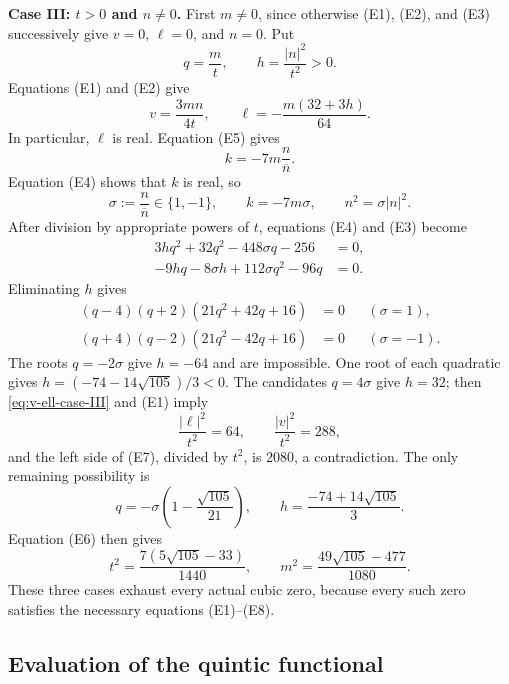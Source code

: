 \documentclass[11pt,reqno]{amsart}
\theoremstyle{definition}
\theoremstyle{remark}
\newcommand{\abs}[1]{\left\lvert #1\right\rvert}
\begin{document}
\medskip
\noindent\textbf{Case III: $t>0$ and $n\ne0$.}
First $m\ne0$, since otherwise (E1), (E2), and (E3) successively give
$v=0$, $\ell=0$, and $n=0$.  Put
\begin{equation}\label{eq:q-h}
q=\frac mt,
\qquad
h=\frac{\abs n^2}{t^2}>0.
\end{equation}
Equations (E1) and (E2) give
\begin{equation}\label{eq:v-ell-case-III}
v=\frac{3mn}{4t},
\qquad
\ell=-\frac{m(32+3h)}{64}.
\end{equation}
In particular, $\ell$ is real.  Equation (E5) gives
\[
k=-7m\frac n{\overline n}.
\]
Equation (E4) shows that $k$ is real, so
\begin{equation}\label{eq:sigma}
\sigma:=\frac n{\overline n}\in\{1,-1\},
\qquad
k=-7m\sigma,
\qquad
n^2=\sigma\abs n^2.
\end{equation}
After division by appropriate powers of $t$, equations (E4) and (E3) become
\begin{align}
3hq^2+32q^2-448\sigma q-256&=0,\label{eq:case-III-a}\\
-9hq-8\sigma h+112\sigma q^2-96q&=0.\label{eq:case-III-b}
\end{align}
Eliminating $h$ gives
\begin{align}
(q-4)(q+2)(21q^2+42q+16)&=0 &&(\sigma=1),\label{eq:resultant-plus}\\
(q+4)(q-2)(21q^2-42q+16)&=0 &&(\sigma=-1).
\label{eq:resultant-minus}
\end{align}
The roots $q=-2\sigma$ give $h=-64$ and are impossible.  One root of each
quadratic gives
$h=(-74-14\sqrt{105})/3<0$.  The candidates $q=4\sigma$ give $h=32$;
then \eqref{eq:v-ell-case-III} and (E1) imply
\[
\frac{\abs\ell^2}{t^2}=64,
\qquad
\frac{\abs v^2}{t^2}=288,
\]
and the left side of (E7), divided by $t^2$, is $2080$, a contradiction.
The only remaining possibility is
\begin{equation}\label{eq:case-III-qh}
q=-\sigma\left(1-\frac{\sqrt{105}}{21}\right),
\qquad
h=\frac{-74+14\sqrt{105}}3.
\end{equation}
Equation (E6) then gives
\begin{equation}\label{eq:case-III-tm}
t^2=\frac{7(5\sqrt{105}-33)}{1440},
\qquad
m^2=\frac{49\sqrt{105}-477}{1080}.
\end{equation}
These three cases exhaust every actual cubic zero, because every such zero
satisfies the necessary equations (E1)--(E8).

\subsection{Evaluation of the quintic functional}
\end{document}
